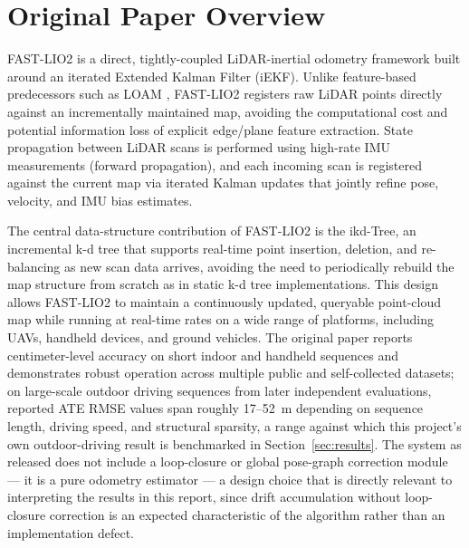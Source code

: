 \documentclass[conference]{IEEEtran}
\begin{document}
\section{Original Paper Overview}
FAST-LIO2 \cite{fastlio2} is a direct, tightly-coupled LiDAR-inertial odometry framework built around an iterated Extended Kalman Filter (iEKF). Unlike feature-based predecessors such as LOAM \cite{loam}, FAST-LIO2 registers raw LiDAR points directly against an incrementally maintained map, avoiding the computational cost and potential information loss of explicit edge/plane feature extraction. State propagation between LiDAR scans is performed using high-rate IMU measurements (forward propagation), and each incoming scan is registered against the current map via iterated Kalman updates that jointly refine pose, velocity, and IMU bias estimates.

The central data-structure contribution of FAST-LIO2 is the ikd-Tree, an incremental k-d tree that supports real-time point insertion, deletion, and re-balancing as new scan data arrives, avoiding the need to periodically rebuild the map structure from scratch as in static k-d tree implementations. This design allows FAST-LIO2 to maintain a continuously updated, queryable point-cloud map while running at real-time rates on a wide range of platforms, including UAVs, handheld devices, and ground vehicles. The original paper reports centimeter-level accuracy on short indoor and handheld sequences and demonstrates robust operation across multiple public and self-collected datasets; on large-scale outdoor driving sequences from later independent evaluations, reported ATE RMSE values span roughly 17--52~m depending on sequence length, driving speed, and structural sparsity, a range against which this project's own outdoor-driving result is benchmarked in Section~\ref{sec:results}. The system as released does not include a loop-closure or global pose-graph correction module --- it is a pure odometry estimator --- a design choice that is directly relevant to interpreting the results in this report, since drift accumulation without loop-closure correction is an expected characteristic of the algorithm rather than an implementation defect.
\end{document}
